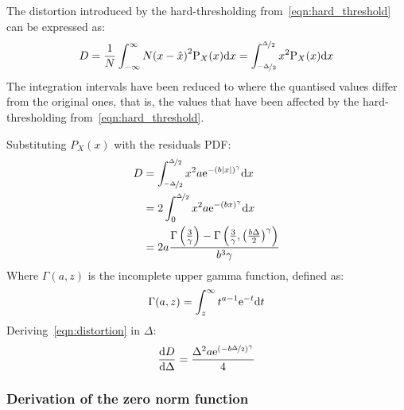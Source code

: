 \documentclass[11pt,a4paper,openright,twoside]{book}
\numberwithin{equation}{section} %
\numberwithin{figure}{section} %
\numberwithin{table}{section} %
\begin{document}
The distortion introduced by the hard-thresholding
from~\eqref{eqn:hard_threshold} can be expressed as:
\begin{equation}
	D
	= \frac{1}{N} \int_{-\infty}^{\infty} N {(x - \hat x)}^2 \text{P}_X (x)\text{d} x
	= \int_{\nicefrac{-\Delta}{2}}^{\nicefrac{\Delta}{2}}
	\label{eqn:int_distortion}
	x^2\text{P}_X (x) \text{d} x
\end{equation}
The integration intervals have been reduced to where the quantised values
differ from the original ones, that is, the values that have been affected by
the hard-thresholding from~\eqref{eqn:hard_threshold}.

Substituting $P_X(x)$ with the residuals \ac{PDF}:
\begin{align}
	D
	&=\int_{\nicefrac{-\Delta}{2}}^{\nicefrac{\Delta}{2}}
	x^2 a \text{e}^{-{\left(b\vert x \vert\right)}^\gamma} \text{d} x \\
	&=2 \int_0^{\nicefrac{\Delta}{2}}
	x^2 a \text{e}^{-{\left(b x \right)}^\gamma} \text{d} x\\
	&=
		2a \frac{\Gamma\left(\frac{3}{\gamma}\right)-
		\Gamma\left(
		\frac{3}{\gamma},{\left(\frac{b\Delta}{2}\right)}^\gamma
		\right)}{b^3\gamma}
	\label{eqn:distortion}
\end{align}
Where $\Gamma(a,z)$ is the incomplete upper gamma function, defined as:
\begin{equation}
	\Gamma(a,z)=\int_z^\infty t^{a-1}\text{e}^{-t}\text{d} t
\end{equation}
Deriving~\eqref{eqn:distortion} in $\Delta$:
\begin{equation}
	\frac{\text{d} D}{\text{d}\Delta} =
	\frac{\Delta^2 a \text{e}^{{(-b\nicefrac{\Delta}{2})}^\gamma}}{4}
	\label{eqn:diff_distortion}
\end{equation}

\subsubsection{Derivation of the zero norm function}
\label{ssub:derivation_of_the_zero_norm_function}
\end{document}
